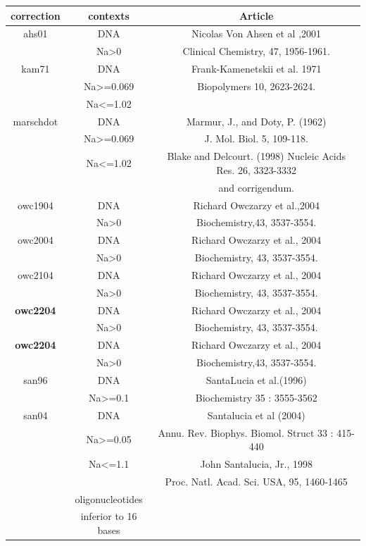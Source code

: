 \documentclass{article}
\begin{document}
\begin{table}[h][c]
\begin{tabular}[h]{| c | c | c |}
\textbf{correction} & \textbf{contexts} & \textbf{Article} \\
\hline
ahs01 & DNA & Nicolas Von Ahsen et al ,2001 \\
 & Na>0 & Clinical Chemistry, 47, 1956-1961.\\
 \hline
kam71 & DNA & Frank-Kamenetskii et al. 1971 \\
 & Na>=0.069  & Biopolymers 10, 2623-2624.\\
 & Na<=1.02  & \\
 \hline
marschdot & DNA & Marmur, J., and Doty, P. (1962) \\
 & Na>=0.069  & J. Mol. Biol. 5, 109-118.\\
 & Na<=1.02 & Blake and Delcourt. (1998) Nucleic Acids Res. 26, 3323-3332 \\ 
 & & and corrigendum.\\
 \hline
owc1904 & DNA & Richard Owczarzy et al.,2004  \\
 & Na>0 & Biochemistry,43, 3537-3554.\\
 \hline
owc2004 & DNA & Richard Owczarzy et al., 2004 \\
 & Na>0 & Biochemistry, 43, 3537-3554.\\ 
 \hline
owc2104 & DNA & Richard Owczarzy et al., 2004 \\
 & Na>0 & Biochemistry, 43, 3537-3554.\\
 \hline 
\textbf{owc2204} & DNA & Richard Owczarzy et al., 2004 \\
 & Na>0 & Biochemistry, 43, 3537-3554.\\
 \hline
\textbf{owc2204} & DNA & Richard Owczarzy et al., 2004 \\
 & Na>0 & Biochemistry,43, 3537-3554.\\
 \hline
san96 & DNA & SantaLucia et al.(1996) \\
 & Na>=0.1 & Biochemistry 35 : 3555-3562\\
 \hline
san04 & DNA & Santalucia et al (2004) \\
 & Na>=0.05 & Annu. Rev. Biophys. Biomol. Struct 33 : 415-440\\
 & Na<=1.1 & John Santalucia, Jr., 1998 \\
 & & Proc. Natl. Acad. Sci. USA, 95, 1460-1465 \\
 & oligonucleotides & \\
 & inferior to 16 bases & \\   

\end{tabular}
\end{table}
\end{document}
